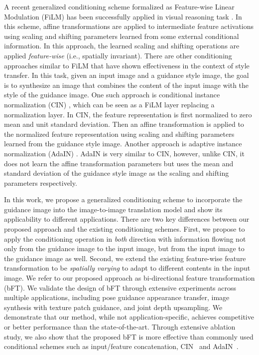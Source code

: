 \documentclass[10pt,twocolumn,letterpaper]{article}
\begin{document}
A recent generalized conditioning scheme formalized as Feature-wise Linear Modulation (FiLM) has been successfully applied in visual reasoning task \cite{perez2018film}. In this scheme, affine transformations are applied to intermediate feature activations using scaling and shifting parameters learned from some external conditional information. In this approach, the learned scaling and shifting operations are applied \emph{feature-wise} (i.e., spatially invariant). 
There are other conditioning approaches similar to FiLM that have shown effectiveness in the context of style transfer. In this task, given an input image and a guidance style image, the goal is to synthesize an image that combines the content of the input image with the style of the guidance image.
One such approach is conditional instance normalization (CIN) \cite{dumoulin2017learned}, which can be seen as a FiLM layer replacing a normalization layer. In CIN, the feature representation is first normalized to zero mean and unit standard deviation. Then an affine transformation is applied to the normalized feature representation using scaling and shifting parameters learned from the guidance style image.
Another approach is adaptive instance normalization (AdaIN) \cite{huang2017arbitrary}. AdaIN is very similar to CIN, however, unlike CIN, it does not learn the affine transformation parameters but uses the mean and standard deviation of the guidance style image as the scaling and shifting parameters respectively. 

In this work, we propose a generalized conditioning scheme to incorporate the guidance image into the image-to-image translation model and show its applicability to different applications. There are two key differences between our proposed approach and the existing conditioning schemes. First, we propose to apply the conditioning operation in \emph{both} direction with information flowing not only from the guidance image to the input image, but from the input image to the guidance image as well. Second, we extend the existing feature-wise feature transformation to be \emph{spatially varying} to adapt to different contents in the input image. We refer to our proposed approach as bi-directional feature transformation (bFT). We validate the design of bFT through extensive experiments across multiple applications, including pose guidance appearance transfer, image synthesis with texture patch guidance, and joint depth upsampling. We demonstrate that our method, while not  application-specific, achieves competitive or better performance than the state-of-the-art. Through extensive ablation study, we also show that the proposed bFT is more effective than commonly used conditional schemes such as input/feature concatenation, CIN~\cite{dumoulin2017learned} and AdaIN~\cite{huang2017arbitrary}.
\end{document}
